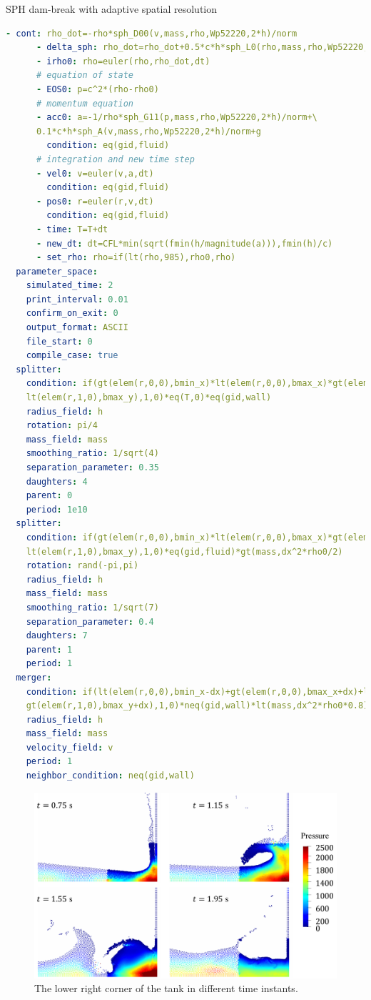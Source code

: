 \documentclass[a4paper,12pt,openany]{book}
\theoremstyle{break}
\begin{document}
\begin{samepage}
\begin{example}{SPH dam-break with adaptive spatial resolution}{}
\begin{lstlisting}[language=YAML]
      - cont: rho_dot=-rho*sph_D00(v,mass,rho,Wp52220,2*h)/norm
      - delta_sph: rho_dot=rho_dot+0.5*c*h*sph_L0(rho,mass,rho,Wp52220,2*h)/norm
      - irho0: rho=euler(rho,rho_dot,dt)
      # equation of state
      - EOS0: p=c^2*(rho-rho0)
      # momentum equation
      - acc0: a=-1/rho*sph_G11(p,mass,rho,Wp52220,2*h)/norm+\
      0.1*c*h*sph_A(v,mass,rho,Wp52220,2*h)/norm+g
        condition: eq(gid,fluid)
      # integration and new time step
      - vel0: v=euler(v,a,dt)
        condition: eq(gid,fluid)
      - pos0: r=euler(r,v,dt)
        condition: eq(gid,fluid)
      - time: T=T+dt
      - new_dt: dt=CFL*min(sqrt(fmin(h/magnitude(a))),fmin(h)/c)
      - set_rho: rho=if(lt(rho,985),rho0,rho)
  parameter_space:
    simulated_time: 2
    print_interval: 0.01
    confirm_on_exit: 0
    output_format: ASCII
    file_start: 0
    compile_case: true
  splitter:
    condition: if(gt(elem(r,0,0),bmin_x)*lt(elem(r,0,0),bmax_x)*gt(elem(r,1,0),bmin_y)*\
    lt(elem(r,1,0),bmax_y),1,0)*eq(T,0)*eq(gid,wall)
    radius_field: h
    rotation: pi/4
    mass_field: mass
    smoothing_ratio: 1/sqrt(4)
    separation_parameter: 0.35
    daughters: 4
    parent: 0
    period: 1e10
  splitter:
    condition: if(gt(elem(r,0,0),bmin_x)*lt(elem(r,0,0),bmax_x)*gt(elem(r,1,0),bmin_y)*\
    lt(elem(r,1,0),bmax_y),1,0)*eq(gid,fluid)*gt(mass,dx^2*rho0/2)
    rotation: rand(-pi,pi)
    radius_field: h
    mass_field: mass
    smoothing_ratio: 1/sqrt(7)
    separation_parameter: 0.4
    daughters: 7
    parent: 1
    period: 1
  merger:
    condition: if(lt(elem(r,0,0),bmin_x-dx)+gt(elem(r,0,0),bmax_x+dx)+lt(elem(r,1,0),bmin_y-dx)+\
    gt(elem(r,1,0),bmax_y+dx),1,0)*neq(gid,wall)*lt(mass,dx^2*rho0*0.8)
    radius_field: h
    mass_field: mass
    velocity_field: v
    period: 1
    neighbor_condition: neq(gid,wall)
\end{lstlisting}
\end{example}
\end{samepage}
\begin{figure}[H]
  \includegraphics[scale=0.4]{adaptive_dam_break_results.pdf}
  \centering
  \caption{The lower right corner of the tank in different time instants.}
  \label{fig:stefan_problem_beam}
\end{figure}\vspace*{3pt}
\end{document}
